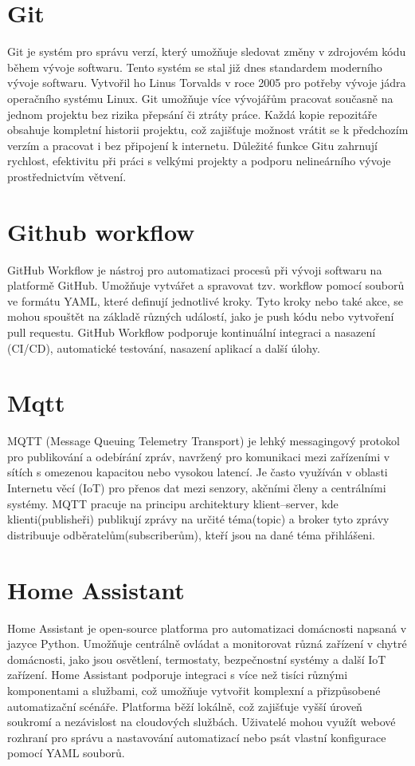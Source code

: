 \section{Git}\label{sec:git}
Git je systém pro správu verzí, který umožňuje sledovat změny v zdrojovém kódu během vývoje softwaru.
Tento systém se stal již dnes standardem moderního vývoje softwaru.
Vytvořil ho Linus Torvalds v roce 2005 pro potřeby vývoje jádra operačního systému Linux.
Git umožňuje více vývojářům pracovat současně na jednom projektu bez rizika přepsání či ztráty práce.
Každá kopie repozitáře obsahuje kompletní historii projektu, což zajišťuje možnost vrátit se k předchozím verzím a pracovat i bez připojení k internetu.
Důležité funkce Gitu zahrnují rychlost, efektivitu při práci s velkými projekty a podporu nelineárního vývoje prostřednictvím větvení.


\section{Github workflow}\label{sec:github-workflow}
GitHub Workflow je nástroj pro automatizaci procesů při vývoji softwaru na platformě GitHub.
Umožňuje vytvářet a spravovat tzv. workflow pomocí souborů ve formátu YAML, které definují jednotlivé kroky.
Tyto kroky nebo také akce, se mohou spouštět na základě různých událostí, jako je push kódu nebo vytvoření pull requestu.
GitHub Workflow podporuje kontinuální integraci a nasazení (CI/CD), automatické testování, nasazení aplikací a další úlohy.


\section{Mqtt}\label{sec:mqtt}
MQTT (Message Queuing Telemetry Transport) je lehký messagingový protokol pro publikování a odebírání zpráv, navržený pro komunikaci mezi zařízeními v sítích s omezenou kapacitou nebo vysokou latencí.
Je často využíván v oblasti Internetu věcí (IoT) pro přenos dat mezi senzory, akčními členy a centrálními systémy.
MQTT pracuje na principu architektury klient–server, kde klienti(publisheři) publikují zprávy na určité téma(topic) a broker tyto zprávy distribuuje odběratelům(subscriberům), kteří jsou na dané téma přihlášeni.


\section{Home Assistant}\label{sec:home-assistant}
Home Assistant je open-source platforma pro automatizaci domácnosti napsaná v jazyce Python.
Umožňuje centrálně ovládat a monitorovat různá zařízení v chytré domácnosti, jako jsou osvětlení, termostaty, bezpečnostní systémy a další IoT zařízení.
Home Assistant podporuje integraci s více než tisíci různými komponentami a službami, což umožňuje vytvořit komplexní a přizpůsobené automatizační scénáře.
Platforma běží lokálně, což zajišťuje vyšší úroveň soukromí a nezávislost na cloudových službách.
Uživatelé mohou využít webové rozhraní pro správu a nastavování automatizací nebo psát vlastní konfigurace pomocí YAML souborů.


